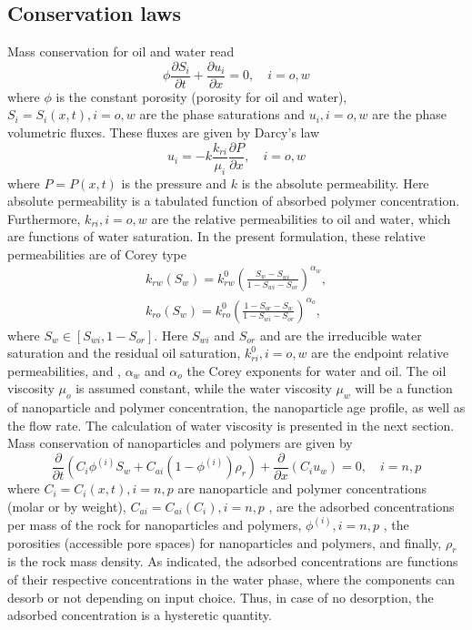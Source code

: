 \documentclass[journal = enfuem, manuscript =  article]{achemso}
\begin{document}
\subsection{Conservation laws}
Mass conservation for oil and water read
\begin{equation} \label{eq:massConservation} %
    \phi\frac{\partial S_i}{\partial t}+\frac{\partial u_i}{\partial x} = 0,\quad i = o, w
\end{equation}
where $\phi$ is the constant porosity (porosity for oil and water), $S_i=S_i(x,t), i = o,w$ are the phase saturations and $u_i, i=o,w$ are the phase volumetric fluxes. These fluxes are given by Darcy’s law
\begin{equation} \label{eq:fluxes} %
    u_i= -k\frac{k_{ri}}{\mu_i}\frac{\partial P}{\partial x},\quad i = o, w
\end{equation}
where $P=P(x,t)$  is the pressure and $k$ is the absolute permeability. Here absolute permeability is a tabulated function of absorbed polymer concentration. Furthermore, $k_{ri}, i = o, w$ are the relative permeabilities to oil and water, which are functions of water saturation. In the present formulation, these relative permeabilities are of Corey type
\begin{subequations}
\begin{eqnarray}
 k_{rw}(S_w)=k^0_{rw}(\frac{S_w-S_{wi}}{1-S_{wi}-S_{or}})^{\alpha_w} ,\\
    k_{ro}(S_w)=k^0_{ro}(\frac{1-S_{or}-S_{w}}{1-S_{wi}-S_{or}})^{\alpha_o} ,
\end{eqnarray}
\end{subequations}
where $S_w\in [S_{wi}, 1-S_{or}]$. Here $S_{wi}$ and $S_{or}$ and are the irreducible water saturation and the residual oil saturation, $k^0_{ri}, i=o,w$  are the endpoint relative permeabilities, and , $\alpha_w$ and $\alpha_o$  the Corey exponents for water and oil. The oil viscosity $\mu_o$ is assumed constant, while the water viscosity $\mu_w$ will be a function of nanoparticle and polymer concentration, the nanoparticle age profile, as well as the flow rate. The calculation of water viscosity is presented in the next section.
Mass conservation of nanoparticles and polymers are given by 
\begin{equation} \label{eq:massConsNPpol} %
    \frac{\partial}{\partial t}(C_i\phi^{(i)}S_w + C_{ai}(1-\phi^{(i)})\rho_r)+ \frac{\partial}{\partial x}(C_i u_w) = 0, \quad i = n, p
\end{equation}
where $C_i=C_i(x,t), i=n,p$ are nanoparticle and polymer concentrations (molar or by weight), $C_{ai}=C_{ai}(C_i), i=n,p$ , are the adsorbed concentrations per mass of the rock for nanoparticles and polymers, $\phi^{(i)}, i=n,p$ , the porosities (accessible pore spaces) for nanoparticles and polymers, and finally, $\rho_r$ is the rock mass density. As indicated, the adsorbed concentrations are functions of their respective concentrations in the water phase, where the components can desorb or not depending on input choice. Thus, in case of no desorption, the adsorbed concentration is a hysteretic quantity.   
\end{document}
